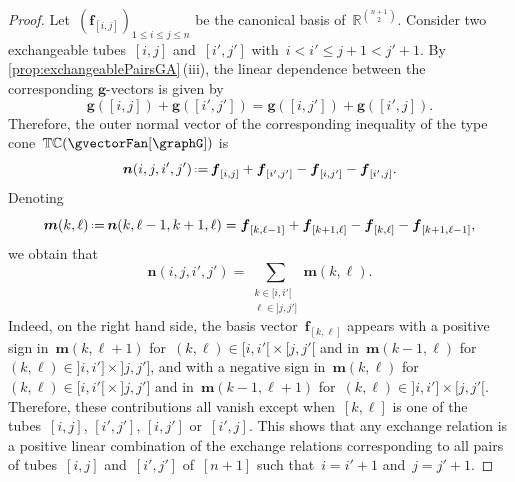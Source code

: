 \documentclass{amsart}
\theoremstyle{definition}
\newcommand{\R}{\mathbb{R}} %
\renewcommand{\b}[1]{{\boldsymbol{#1}}} %
\newcommand{\eqdef}{\mbox{\,\raisebox{0.2ex}{\scriptsize\ensuremath{\mathrm:}}\ensuremath{=}\,}} %
\newcommand{\gvector}[1]{\b{g}(#1)} %
\newcommand{\typeCone}{\mathbb{TC}} %
\begin{document}
\begin{proof}
Let~$(\b{f}_{[i,j]})_{1 \le i \le j \le n}$ be the canonical basis of~$\R^{\binom{n+1}{2}}$.
Consider two exchangeable tubes~$[i,j]$ and~$[i',j']$ with~${i < i' \le j+1 < j'+1}$.
By \cref{prop:exchangeablePairsGA}\,(iii), the linear dependence between the corresponding $\b{g}$-vectors is given by
\[
\gvector{[i,j]} + \gvector{[i',j']} = \gvector{[i,j']} + \gvector{[i',j]}.
\]
Therefore, the outer normal vector of the corresponding inequality of the type cone~$\typeCone(\gvectorFan[\graphG])$ is
\[
\b{n}(i,j,i',j') \eqdef \b{f}_{[i,j]} + \b{f}_{[i',j']} - \b{f}_{[i,j']} - \b{f}_{[i',j]}.
\]
Denoting
\[
\b{m}(k,\ell) \eqdef \b{n}(k,\ell-1,k+1,\ell) = \b{f}_{[k, \ell-1]} + \b{f}_{[k+1, \ell]} - \b{f}_{[k, \ell]} - \b{f}_{[k+1, \ell-1]},
\]
we obtain that
\[
\b{n}(i,j,i',j') = \sum_{\substack{k \in {[i,i'[} \\ \ell \in {]j,j']}}} \b{m}(k,\ell).
\]
Indeed, on the right hand side, the basis vector~$\b{f}_{[k,\ell]}$ appears with a positive sign in~$\b{m}(k,{\ell+1})$ for~$(k,\ell) \in {[i,i'[} \times {[j,j'[}$ and in~$\b{m}(k-1, \ell)$ for~$(k,\ell) \in {]i,i']} \times {]j,j']}$, and with a negative sign in~$\b{m}(k,\ell)$ for~$(k,\ell) \in {[i,i'[} \times {]j,j']}$ and in~$\b{m}(k-1,\ell+1)$ for~$(k,\ell) \in {]i,i']} \times {[j,j'[}$.
Therefore, these contributions all vanish except when~$[k, \ell]$ is one of the tubes~$[i,j]$, $[i',j']$, $[i,j']$ or~$[i',j]$.
This shows that any exchange relation is a positive linear combination of the exchange relations corresponding to all pairs of tubes~$[i,j]$ and~$[i',j']$ of~$[n+1]$ such that~$i = i'+1$ and~$j = j'+1$.


\end{proof}
\end{document}
